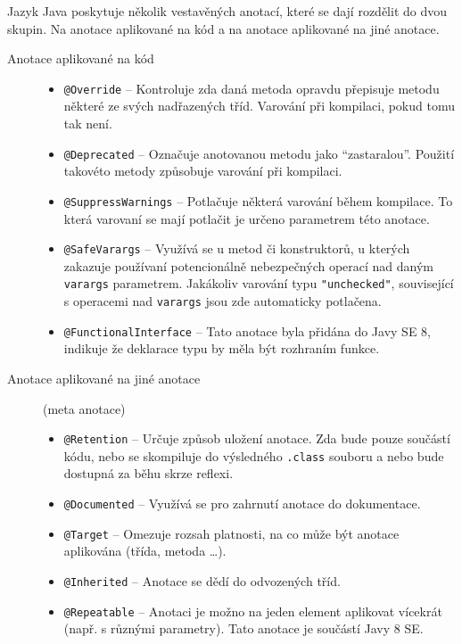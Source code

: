 Jazyk Java poskytuje několik vestavěných anotací, které se dají rozdělit do dvou skupin. Na anotace aplikované na kód a na anotace aplikované na jiné anotace.
\begin{description}
  \item[Anotace aplikované na kód]\hfill
  \begin{itemize}
     \item \texttt{@Override} -- Kontroluje zda daná metoda opravdu přepisuje metodu některé ze svých nadřazených tříd. Varování při kompilaci, pokud tomu tak není.
     \item \texttt{@Deprecated} -- Označuje anotovanou metodu jako "`zastaralou"'. Použití takovéto metody způsobuje varování při kompilaci.
     \item \texttt{@SuppressWarnings} -- Potlačuje některá varování během kompilace. To která varovaní se mají potlačit je určeno parametrem této anotace.
     \item \texttt{@SafeVarargs} -- Využívá se u metod či konstruktorů, u kterých zakazuje používaní potencionálně nebezpečných operací nad daným \texttt{varargs} parametrem. Jakákoliv varování typu \texttt{"unchecked"}, související s operacemi nad \texttt{varargs} jsou zde automaticky potlačena.
     \item \texttt{@FunctionalInterface} -- Tato anotace byla přidána do Javy SE 8, indikuje že deklarace typu by měla být rozhraním funkce.
  \end{itemize} 
  \item[Anotace aplikované na jiné anotace] (meta anotace)\hfill
  \begin{itemize}
    \item \texttt{@Retention} -- Určuje způsob uložení anotace. Zda bude pouze součástí kódu, nebo se skompiluje do výsledného \texttt{.class} souboru a nebo bude dostupná za běhu skrze reflexi.
    \item \texttt{@Documented} -- Využívá se pro zahrnutí anotace do dokumentace.
    \item \texttt{@Target} -- Omezuje rozsah platnosti, na co může být anotace aplikována (třída, metoda \ldots).
    \item \texttt{@Inherited} -- Anotace se dědí do odvozených tříd.
    \item \texttt{@Repeatable} -- Anotaci je možno na jeden element aplikovat vícekrát (např. s různými parametry). Tato anotace je součástí Javy 8 SE.
  \end{itemize}
\end{description}

